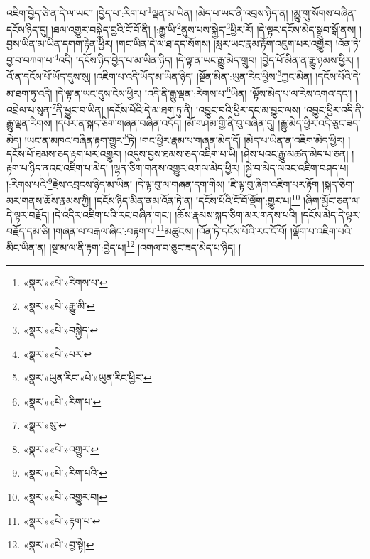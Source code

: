 འཇིག་བྱེད་ཅེ་ན་དེ་ལ་ཡང་། །བྱེད་པ་:རིག་པ་\footnote{«སྣར་»«པེ་»རིགས་པ་}ལྡན་མ་ཡིན། །མེད་པ་ཡང་ནི་འབྲས་ཉིད་ན། །མྱུ་གུ་སོགས་བཞིན་དངོས་ཉིད་དུ། །ཐལ་འགྱུར་བསྐྱེད་བྱའི་ངོ་བོ་ནི། །:རྒྱུ་ཡི་\footnote{«སྣར་»«པེ་»རྒྱུ་མི་}ནུས་པས་སྐྱེད་\footnote{«སྣར་»«པེ་»བསྐྱེད་}ཕྱིར་རོ། །དེ་ལྟར་དངོས་མེད་སྒྲུབ་སྒོ་ནས། །བྱས་ཡིན་མ་ཡིན་དགག་རྟེན་ཕྱིར། །གང་ཡིན་དེ་ལ་ཐ་དད་སོགས། །སླར་ཡང་རྣམ་རྟོག་འཇུག་པར་འགྱུར། །འོན་ཏེ་བྱ་བ་བཀག་པ་\footnote{«སྣར་»«པེ་»པར་}འདི། །དངོས་ཉིད་བྱེད་པ་མ་ཡིན་ཉིད། །དེ་ལྟ་ན་ཡང་རྒྱུ་མེད་གྲུབ། །བྱེད་པོ་མིན་ན་རྒྱུ་ཉམས་ཕྱིར། །འོ་ན་དངོས་པོ་ཡོད་དུས་སུ། །འཇིག་པ་འདི་ཡོད་མ་ཡིན་ཉིད། །སྔོན་མིན་:ཡུན་རིང་ཕྱིས་\footnote{«སྣར་»ཡུན་རིང་«པེ་»ཡུན་རིང་ཕྱིར་}ཀྱང་མིན། །དངོས་པོའི་དེ་མ་ཐག་ཏུ་འདི། །དེ་ལྟ་ན་ཡང་དུས་ངེས་ཕྱིར། །འདི་ནི་རྒྱུ་ལྡན་:རེགས་པ་\footnote{«སྣར་»«པེ་»རིག་པ་}ཡིན། །ལྟོས་མེད་པ་ལ་རེས་འགའ་དང་། །འབྲེལ་པ་སུན་\footnote{«སྣར་»སུ་}ནི་ཕྱུང་བ་ཡིན། །དངོས་པོའི་དེ་མ་ཐག་ཏུ་ནི། །འབྱུང་བའི་ཕྱིར་དང་མ་བྱུང་ལས། །འབྱུང་ཕྱིར་འདི་ནི་རྒྱུ་ལྡན་རིགས། །དཔེར་ན་སྐད་ཅིག་གཞན་བཞིན་འདོད། །མོ་གཤམ་གྱི་ནི་བུ་བཞིན་དུ། །རྒྱུ་མེད་ཕྱིར་འདི་ཅུང་ཟད་མེད། །ཡང་ན་མཁའ་བཞིན་རྟག་གྱུར་\footnote{«སྣར་»«པེ་»འགྱུར་}ཏེ། །གང་ཕྱིར་རྣམ་པ་གཞན་མེད་དོ། །མེད་པ་ཡིན་ན་འཇིག་མེད་ཕྱིར། །དངོས་པོ་ཐམས་ཅད་རྟག་པར་འགྱུར། །འདུས་བྱས་ཐམས་ཅད་འཇིག་པ་ཡི། །ཤེས་པའང་རྒྱུ་མཚན་མེད་པ་ཅན། །རྟག་པ་ཉིད་ནའང་འཇིག་པ་མེད། །ལྷན་ཅིག་གནས་འགྱུར་འགལ་མེད་ཕྱིར། །སྐྱེ་བ་མེད་ལའང་འཇིག་བཤད་པ། །:རིགས་པའི་\footnote{«སྣར་»«པེ་»རིག་པའི་}རྗེས་འབྲངས་ཉིད་མ་ཡིན། །དེ་ལྟ་བུ་ལ་གཞན་དག་གིས། །ཇི་ལྟ་བུ་ཞིག་འཇིག་པར་རྟོག །སྐད་ཅིག་མར་གནས་ཆོས་རྣམས་ཀྱི། །དངོས་ཉིད་མིན་ནམ་འོན་ཏེ་ན། །དངོས་པོའི་ངོ་བོ་ལྡོག་:གྱུར་པ།\footnote{«སྣར་»«པེ་»འགྱུར་བ།} །ཞིག་མྱོང་ཅན་ལ་དེ་ལྟར་བརྗོད། །དེ་འདིར་འཇིག་པའི་རང་བཞིན་གང་། །ཆོས་རྣམས་སྐད་ཅིག་མར་གནས་པའི། །དངོས་མེད་དེ་ལྟར་བརྗོད་དམ་ཅི། །གཞན་ལ་བརྒལ་ཞིང་:བརྟག་པ་\footnote{«སྣར་»«པེ་»རྟག་པ་}མཚུངས། །འོན་ཏེ་དངོས་པོའི་རང་ངོ་བོ། །ལྡོག་པ་འཇིག་པའི་མིང་ཡིན་ན། །སྔ་མ་ལ་ནི་རྟག་:བྱེད་པ།\footnote{«སྣར་»«པེ་»བྱ་སྟེ།} །འགལ་བ་ཅུང་ཟད་མེད་པ་ཉིད། །

